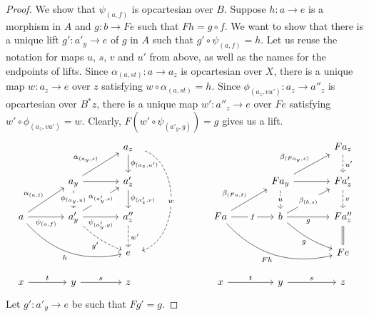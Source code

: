 \begin{proof}
  We show that $\psi_{(a,f)}$ is opcartesian over $B$.
  Suppose $h : a \to e$ is a morphism in $A$
  and $g : b \to F e$ such that $F h = g \circ f$.
  We want to show that there is a unique lift
  $g' : a'_y \to e$ of $g$ in $A$
  such that $g' \circ \psi_{(a,f)} = h$.
  Let us reuse the notation for maps $u$, $s$, $v$ and $u'$ from above,
  as well as the names for the endpoints of lifts.
  Since $\alpha_{(a,st)} : a \to a_z$ is opcartesian over $X$,
  there is a unique map $w : a_z \to e$
  over $z$ satisfying $w \circ \alpha_{(a,st)} = h$.  
  Since $\phi_{(a_z,vu')} : a_z \to a''_z$ is opcartesian over $B^* z$,
  there is a unique map $w' : a''_z \to e$
  over $F e$ satisfying $w' \circ \phi_{(a_z,vu')} = w$.
  Clearly, $F (w' \circ \psi_{(a'_y,g)}) = g$ gives us a lift.
  \[\begin{tikzcd}[column sep = large]
	&& {a_z} &&&& {F a_z} \\
	& {a_y} & {a'_z} &&& {F a_y} & {F a'_z} \\
	a & {a_y'} & {a''_z} && Fa & b & {F a''_z} \\
	&& e &&&& {F e} \\
	x & y & z && x & y & z
	\arrow["{{\phi_{(a_z,u')}}}", from=1-3, to=2-3]
	\arrow["{u'}", dashed, from=1-7, to=2-7]
	\arrow["{{\alpha_{(a_y,s)}}}", from=2-2, to=1-3]
	\arrow[from=2-2, to=2-3]
	\arrow["{{\phi_{(a_y,u)}}}"{description}, from=2-2, to=3-2]
	\arrow["{{\phi_{(a'_z,v)}}}", from=2-3, to=3-3]
	\arrow["{{\beta_{(F a_y, s)}}}", from=2-6, to=1-7]
	\arrow[from=2-6, to=2-7]
	\arrow["u"{description}, dashed, from=2-6, to=3-6]
	\arrow["v", dashed, from=2-7, to=3-7]
	\arrow["{{\alpha_{(a,t)}}}", from=3-1, to=2-2]
	\arrow["{\psi_{(a,f)}}"', from=3-1, to=3-2]
	\arrow["h"', bend right, from=3-1, to=4-3]
	\arrow["{{\alpha_{(a'_y,s)}}}"{description}, from=3-2, to=2-3]
	\arrow["{\psi_{(a'_y,g)}}"', from=3-2, to=3-3]
	\arrow["{g'}"', bend right = 10, dashed, from=3-2, to=4-3]
	\arrow["w'", dashed, from=3-3, to=4-3]
	\arrow["{{\beta_{(F a, t)}}}", from=3-5, to=2-6]
	\arrow["f"{description}, from=3-5, to=3-6]
	\arrow["{F h}"', bend right, from=3-5, to=4-7]
	\arrow["{{\beta_{(b, s)}}}"{description}, from=3-6, to=2-7]
	\arrow["g"', from=3-6, to=3-7]
	\arrow["g"', bend right = 10, from=3-6, to=4-7]
	\arrow[equals, from=3-7, to=4-7]
	\arrow["t", from=5-1, to=5-2]
	\arrow["s", from=5-2, to=5-3]
	\arrow["t", from=5-5, to=5-6]
	\arrow["s", from=5-6, to=5-7]
  \arrow["w"{description}, shift left=3, bend left = 70, dashed, from=1-3, to=4-3]
  \end{tikzcd}\]
  Let $g' : a'_y \to e$ be such that $F g' = g$.

\end{proof}
